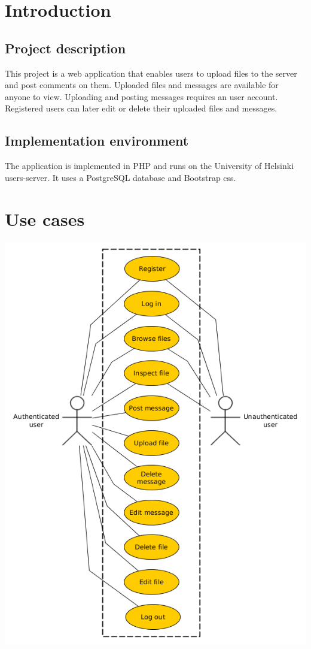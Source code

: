 \documentclass[10pt,a4paper]{article}
\begin{document}
\section{Introduction}
\subsection{Project description}
This project is a web application that enables users to upload files to the server and post comments on them. Uploaded files and messages are available for anyone to view. Uploading and posting messages requires an user account. Registered users can later edit or delete their uploaded files and messages.

\subsection{Implementation environment}
The application is implemented in PHP and runs on the University of Helsinki users-server. It uses a PostgreSQL database and Bootstrap css.

\section{Use cases}
\includegraphics[scale=0.5]{diagrams/use_case.png}
\end{document}
